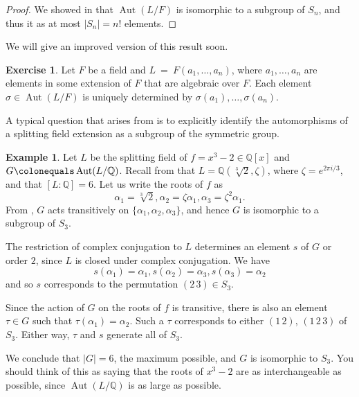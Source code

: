 \documentclass[12pt]{report}
\numberwithin{equation}{section}
\numberwithin{theorem}{chapter}
\theoremstyle{definition}
\newtheorem{example}[theorem]{Example}
\newtheorem{exercise}{Exercise}
\newtheorem*{basic properties}{Basic Properties}
\newtheorem*{Important Remark}{Important Remark}
\newcommand{\Q}{\mathbb{Q}}
\DeclareMathOperator{\Aut}{Aut}
\begin{document}
\begin{proof}
	We showed in  that $\Aut(L/F)$ is isomorphic to a subgroup of $S_n$, and thus it as at most $|S_n| = n!$ elements.
\end{proof}

We will give an improved version of this result soon.


\begin{exercise}\label{aut elements determined by image of gens}
Let $F$ be a field and $L~=~F(a_1, \ldots, a_n)$, where $a_1,\ldots, a_n$ are elements in some extension of $F$ that are algebraic over $F$. Each element $\sigma \in \Aut(L/F)$ is uniquely determined by $\sigma(a_1),\ldots, \sigma(a_n)$.
\end{exercise}

A typical question that arises from  is to explicitly identify the automorphisms of a splitting field extension as a subgroup of the symmetric group.

\begin{example} 
Let $L$ be the splitting field of $f = x^3-2 \in \Q[x]$ and $G \colonequals \Aut(L/\Q)$. Recall from  that $L = \Q(\sqrt[3]{2}, \zeta)$, where $\zeta = e^{2 \pi i/3}$, and that $[L:\Q] = 6$.
Let us write the roots of $f$ as 
$$\alpha_1 = \sqrt[3]{2}, \alpha_2 = \zeta \alpha_1, \alpha_3 = \zeta^2 \alpha_1.$$
From , $G$ acts transitively on $\{\alpha_1, \alpha_2, \alpha_3\}$, and hence $G$ is isomorphic to a subgroup of $S_3$.

The restriction of complex conjugation to $L$ determines an element $s$ of $G$ or order $2$, since $L$ is closed under complex conjugation. We have 
$$s(\alpha_1) = \alpha_1, s(\alpha_2) = \alpha_3, s(\alpha_3) = \alpha_2$$
and so $s$ corresponds to the permutation $(2 \, 3) \in S_3$.

Since the action of $G$ on the roots of $f$ is transitive, there is also an element $\tau \in G$ such that $\tau(\alpha_1) = \alpha_2$. Such a $\tau$ corresponds to either $(1 \, 2)$, $(1 \, 2 \, 3)$ of $S_3$. Either way, $\tau$ and $s$ generate all of $S_3$.

We conclude that $|G| = 6$, the maximum possible, and $G$ is isomorphic to $S_3$. You should think of this as saying that the roots of $x^3 -2$ are as interchangeable as possible, since $\Aut(L/\Q)$ is as large as possible. 
\end{example}
\end{document}
